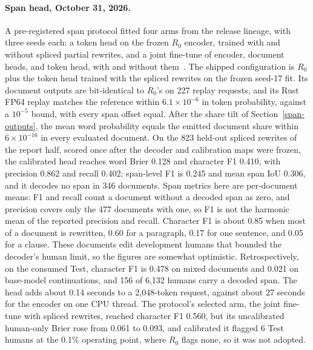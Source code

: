 \paragraph{Span head, October 31, 2026.}\label{span-evidence}
A pre-registered span protocol fitted four arms from the release lineage, with
three seeds each: a token head on the frozen \(R_0\) encoder, trained with and
without spliced partial rewrites, and a joint fine-tune of encoder, document
heads, and token head, with and without them~\cite{spansresults}. The shipped
configuration is \(R_0\) plus the token head trained with the spliced
rewrites on the frozen seed-17 fit. Its document outputs are bit-identical to
\(R_0\)'s on 227 replay requests, and its Rust FP64 replay matches the reference
within \(6.1\times10^{-6}\) in token probability, against a \(10^{-5}\) bound,
with every span offset equal. After the share tilt of
Section~\ref{span-outputs}, the mean word probability equals the emitted
document share within \(6\times10^{-16}\) in every evaluated document. On the 823 held-out spliced rewrites of the report
half, scored once after the decoder and calibration maps were frozen, the
calibrated head reaches word Brier 0.128 and character F1 0.410, with precision 0.862 and recall 0.402;
span-level F1 is 0.245 and mean span IoU 0.306, and it decodes no span in 346
documents. Span metrics here are per-document means: F1 and recall count a
document without a decoded span as zero, and precision covers only the 477
documents with one, so F1 is not the harmonic mean of the reported precision
and recall. Character F1 is about 0.85 when most of a
document is rewritten, 0.60 for a paragraph, 0.17 for one sentence, and 0.05
for a clause. These documents edit development humans that bounded the decoder's
human limit, so the figures are somewhat optimistic. Retrospectively, on the
consumed Test, character F1 is 0.478 on mixed documents and 0.021 on base-model
continuations, and 156 of 6,132 humans carry a decoded span. The head adds about
0.14 seconds to a 2,048-token request, against about 27 seconds for the encoder
on one CPU thread. The protocol's selected arm, the joint fine-tune with spliced
rewrites, reached character F1 0.560, but its uncalibrated human-only Brier rose
from 0.061 to 0.093, and calibrated it flagged 6 Test humans at the 0.1\%
operating point, where \(R_0\) flags none, so it was not adopted.

